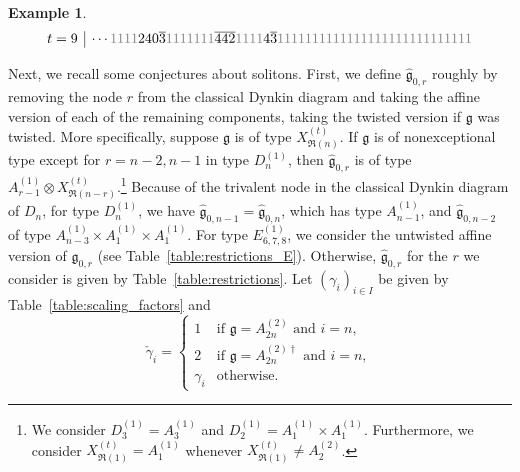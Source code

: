 \documentclass[reqno]{amsart}
\newcommand{\g}{\mathfrak{g}}
\newcommand{\modgamma}{\check{\gamma}} %
\theoremstyle{plain}
\theoremstyle{definition}
\newtheorem{ex}[thm]{Example}
\numberwithin{equation}{section}
\begin{document}
\begin{ex}
\[{\begin{array}{c|c}
t = 9 & \cdots {\color{gray} 1} {\color{gray} 1} {\color{gray} 1} {\color{gray} 1} 2 4 0 \overline{3} {\color{gray} 1} {\color{gray} 1} {\color{gray} 1} {\color{gray} 1} {\color{gray} 1} {\color{gray} 1} {\color{gray} 1} \overline{4} \overline{4} \overline{2} {\color{gray} 1} {\color{gray} 1} {\color{gray} 1} {\color{gray} 1} 4 \overline{3} {\color{gray} 1} {\color{gray} 1} {\color{gray} 1} {\color{gray} 1} {\color{gray} 1} {\color{gray} 1} {\color{gray} 1} {\color{gray} 1} {\color{gray} 1} {\color{gray} 1} {\color{gray} 1} {\color{gray} 1} {\color{gray} 1} {\color{gray} 1} {\color{gray} 1} {\color{gray} 1} {\color{gray} 1} {\color{gray} 1} {\color{gray} 1} {\color{gray} 1} {\color{gray} 1} {\color{gray} 1} {\color{gray} 1} {\color{gray} 1} {\color{gray} 1} {\color{gray} 1} {\color{gray} 1} {\color{gray} 1}\\
\end{array}}
\]
\end{ex}

Next, we recall some conjectures about solitons.
First, we define $\widehat{\g}_{0,r}$ roughly by removing the node $r$ from the classical Dynkin diagram and taking the affine version of each of the remaining components, taking the twisted version if $\g$ was twisted.
More specifically, suppose $\g$ is of type $X_{\mathfrak{R}(n)}^{(t)}$.
If $\g$ is of nonexceptional type except for $r = n-2,n-1$ in type $D_n^{(1)}$, then $\widehat{\g}_{0,r}$ is of type $A_{r-1}^{(1)} \otimes X_{\mathfrak{R}(n-r)}^{(t)}$.\footnote{We consider $D_3^{(1)} = A_3^{(1)}$ and $D_2^{(1)} = A_1^{(1)} \times A_1^{(1)}$. Furthermore, we consider $X_{\mathfrak{R}(1)}^{(t)} = A_1^{(1)}$ whenever $X_{\mathfrak{R}(1)}^{(t)} \neq A_2^{(2)}$.}
Because of the trivalent node in the classical Dynkin diagram of $D_n$, for type $D_n^{(1)}$, we have $\widehat{\g}_{0,n-1} = \widehat{\g}_{0,n}$, which has type $A_{n-1}^{(1)}$, and $\widehat{\g}_{0,n-2}$ of type $A_{n-3}^{(1)} \times A_1^{(1)} \times A_1^{(1)}$.
For type $E_{6,7,8}^{(1)}$, we consider the untwisted affine version of $\g_{0,r}$ (see Table~\ref{table:restrictions_E}).
Otherwise, $\widehat{\g}_{0,r}$ for the $r$ we consider is given by Table~\ref{table:restrictions}.
Let  $(\gamma_i)_{i \in I}$ be given by Table~\ref{table:scaling_factors} and
\[
\modgamma_i = \begin{cases}
1 & \text{if } \g = A_{2n}^{(2)} \text{ and } i = n, \\
2 & \text{if } \g = A_{2n}^{(2)\dagger} \text{ and } i = n, \\
\gamma_i & \text{otherwise.}
\end{cases}
\]
\end{document}
